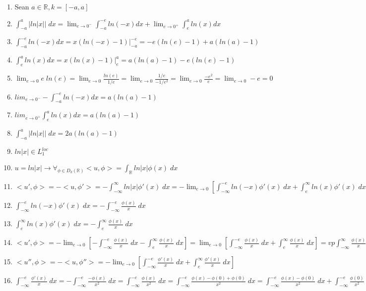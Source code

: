 \begin{enumerate}
  \item Sean $a \in \mathbb{R}, k = [-a, a]$
  \item $\int_{-a}^{a} |ln|x|| \; dx = \lim_{e \to 0^-} \int_{-a}^{-e} ln(-x) dx + \lim_{e \to 0^+} \int_{e}^{a} ln(x) dx$ 
  \item $\int_{-a}^{-e} ln(-x) dx = x(ln(-x) - 1) |_{-a}^{-e} = -e(ln(e) - 1) + a(ln(a) - 1)$
  \item $\int_{e}^{a} ln(x) dx = x(ln(x) - 1) |_{e}^{a} = a(ln(a) - 1) - e(ln(e) - 1)$
  \item $\lim_{e \to 0} e \; ln(e) = \lim_{e \to 0}  \frac{ln(e)}{1/e} = \lim_{e \to 0}  \frac{1/e}{-1/e^2} = \lim_{e \to 0}  \frac{-e^2}{e} = \lim_{e \to 0} -e = 0$
  \item $lim_{e \to 0^-} -\int_{-a}^{-e} ln(-x) dx = a(ln(a) - 1)$
  \item $lim_{e \to 0^+} \int_{e}^{a} ln(x) dx = a(ln(a) - 1)$
  \item $\int_{-a}^{a} |ln|x|| \; dx = 2a(ln(a) - 1)$
  \item $ln|x| \in L_1^{loc}$
  \item $u=ln|x| \to \forall_{\phi \in D_k(\mathbb{R})} <u, \phi> = \int_\mathbb{R} ln|x| \phi(x) \; dx$
  \item $<u', \phi> = - <u, \phi'> = - \int_{-\infty}^\infty ln|x| \phi'(x) \; dx = -\lim_{e \to 0} \left[ \int_{-\infty}^{-e} ln(-x) \phi'(x) \; dx + \int_{e}^{\infty} ln(x) \phi'(x) \; dx\right]$
  \item $\int_{-\infty}^{-e} ln(-x) \phi'(x) \; dx = - \int_{-\infty}^{-e} \frac{\phi(x)}{x} \; dx$
  \item $\int_{e}^{\infty} ln(x) \phi'(x) \; dx = - \int_{e}^{\infty} \frac{\phi(x)}{x} \; dx$
  \item $<u', \phi> = - \lim_{e \to 0} \left[ - \int_{-\infty}^{-e} \frac{\phi(x)}{x} \; dx - \int_{e}^{\infty} \frac{\phi(x)}{x} \; dx \right] = \lim_{e \to 0} \left[ \int_{-\infty}^{-e} \frac{\phi(x)}{x} \; dx + \int_{e}^{\infty} \frac{\phi(x)}{x} \; dx \right] = vp \int_{-\infty}^\infty \frac{\phi(x)}{x} \; dx$
  \item $<u'', \phi> = - <u, \phi''> = -\lim_{e \to 0} \left[ \int_{-\infty}^{-e} \frac{\phi'(x)}{x} \; dx + \int_{e}^{\infty} \frac{\phi'(x)}{x} \; dx \right]$
  \item $\int_{-\infty}^{-e} \frac{\phi'(x)}{x} \; dx = - \int_{-\infty}^{-e} \frac{-\phi(x)}{x^2} \; dx = \int_{-\infty}^{-e} \frac{\phi(x)}{x^2} \; dx = \int_{-\infty}^{-e} \frac{\phi(x) - \phi(0) + \phi(0) }{x^2} \; dx = \int_{-\infty}^{-e} \frac{\phi(x) - \phi(0)}{x^2} \; dx + \int_{-\infty}^{-e} \frac{\phi(0)}{x^2} \; dx $

\end{enumerate}
